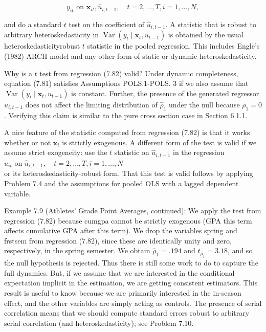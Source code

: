 \documentclass[10pt]{article}
\begin{document}
\begin{equation*}
y_{i t} \text { on } \mathbf{x}_{i t}, \hat{u}_{i, t-1}, \quad t=2, \ldots, T, i=1, \ldots, N, \tag{7.82}
\end{equation*}


and do a standard $t$ test on the coefficient of $\hat{u}_{i, t-1}$. A statistic that is robust to arbitrary heteroskedasticity in $\operatorname{Var}\left(y_{t} \mid \mathbf{x}_{t}, u_{t-1}\right)$ is obtained by the usual heteroskedasticityrobust $t$ statistic in the pooled regression. This includes Engle's (1982) ARCH model and any other form of static or dynamic heteroskedasticity.

Why is a $t$ test from regression (7.82) valid? Under dynamic completeness, equation (7.81) satisfies Assumptions POLS.1-POLS. 3 if we also assume that $\operatorname{Var}\left(y_{t} \mid \mathbf{x}_{t}, u_{t-1}\right)$ is constant. Further, the presence of the generated regressor $\hat{u}_{i, t-1}$ does not affect the limiting distribution of $\hat{\rho}_{1}$ under the null because $\rho_{1}=0$. Verifying this claim is similar to the pure cross section case in Section 6.1.1.

A nice feature of the statistic computed from regression (7.82) is that it works whether or not $\mathbf{x}_{t}$ is strictly exogenous. A different form of the test is valid if we assume strict exogeneity: use the $t$ statistic on $\hat{u}_{i, t-1}$ in the regression\\
$\hat{u}_{i t}$ on $\hat{u}_{i, t-1}, \quad t=2, \ldots, T, i=1, \ldots, N$\\
or its heteroskedasticity-robust form. That this test is valid follows by applying Problem 7.4 and the assumptions for pooled OLS with a lagged dependent variable.

Example 7.9 (Athletes' Grade Point Averages, continued): We apply the test from regression (7.82) because cumgpa cannot be strictly exogenous (GPA this term affects cumulative GPA after this term). We drop the variables spring and frstsem from regression (7.82), since these are identically unity and zero, respectively, in the spring semester. We obtain $\hat{\rho}_{1}=.194$ and $t_{\hat{\rho}_{1}}=3.18$, and so the null hypothesis is rejected. Thus there is still some work to do to capture the full dynamics. But, if we assume that we are interested in the conditional expectation implicit in the estimation, we are getting consistent estimators. This result is useful to know because we are primarily interested in the in-season effect, and the other variables are simply acting as controls. The presence of serial correlation means that we should compute standard errors robust to arbitrary serial correlation (and heteroskedasticity); see Problem 7.10.
\end{document}
